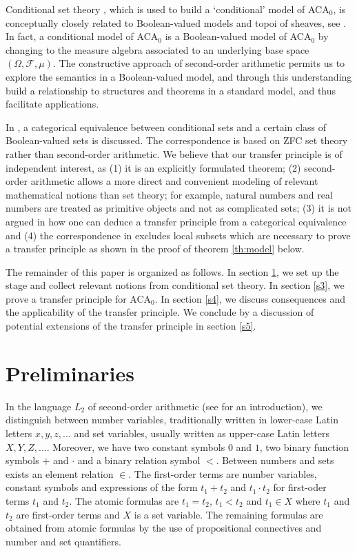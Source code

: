 \documentclass{jloganal}
\numberwithin{equation}{section}
\theoremstyle{plain}
\begin{document}
Conditional set theory \cite{drapeau2016algebra}, which is used to build a `conditional' model of ACA$_{0}$,   
is conceptually closely related to Boolean-valued models and topoi of sheaves, see \cite{jamneshan2014sheaves}.  
In fact, a conditional model of ACA$_0$ is a Boolean-valued model of ACA$_0$ by changing to the measure algebra associated to an underlying base space $(\Omega,\mathcal{F},\mu)$.  
The constructive approach of second-order arithmetic permits us to explore the semantics in a Boolean-valued model, and through this understanding build a relationship to structures and theorems in a standard model, and thus facilitate applications.    

In \cite{aviles2018boolean}, a categorical equivalence between conditional sets and a certain class of Boolean-valued sets is discussed. 
The correspondence is based on ZFC set theory rather than second-order arithmetic. We believe that our transfer principle is of independent interest, as (1) it is an explicitly formulated theorem; (2) second-order arithmetic allows a more direct and convenient modeling of relevant mathematical notions than set theory; for example, natural numbers and real numbers are treated as primitive objects and not as complicated sets; (3) it is not argued in \cite{aviles2018boolean} how one can deduce a transfer principle from a categorical equivalence and (4) the correspondence in \cite[Theorem 3.1]{aviles2018boolean} excludes local subsets which are necessary to prove a transfer principle as shown in the proof of theorem \ref{th:model} below.  

The remainder of this paper is organized as follows. 
In section \ref{s2}, we set up the stage and collect relevant notions from conditional set theory. 
In section \ref{s3}, we prove a transfer principle for ACA$_0$. 
In section \ref{s4}, we discuss consequences and the applicability of the transfer principle.  
We conclude by a discussion of potential extensions of the transfer principle in section \ref{s5}.   


\section{Preliminaries}\label{s2}

In the language $L_2$ of second-order arithmetic (see \cite{simpson2009subsystems} for an introduction), we distinguish between number variables, traditionally written in lower-case Latin letters $x,y,z,...$ and set variables, usually written as upper-case Latin letters $X,Y,Z,...$. 
Moreover, we have two constant symbols $0$ and $1$, two binary function symbols $+$ and $\cdot$ and a binary relation symbol $<$.  
Between numbers and sets exists an element relation $\in$. 
The first-order terms are number variables, constant symbols and expressions of the form $t_1+t_2$ and $t_1\cdot t_2$ for first-oder terms $t_1$ and $t_2$.  
The atomic formulas are $t_1=t_2$, $t_1<t_2$ and $t_1\in X$ where $t_1$ and $t_2$ are first-order terms and $X$ is a set variable. 
The remaining formulas are obtained from atomic formulas by the use of propositional connectives and number and set quantifiers.  
\end{document}
